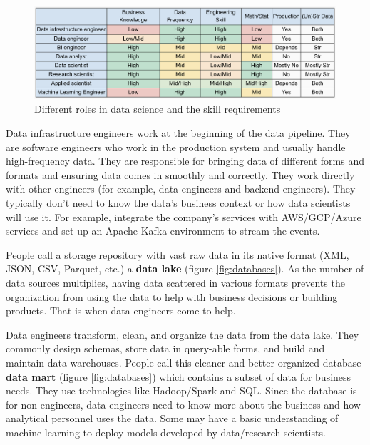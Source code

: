 \documentclass[
  12pt,
]{krantz}
\begin{document}
\begin{figure}
\centering
\includegraphics{images/dsrole.png}
\caption{Different roles in data science and the skill requirements}
\end{figure}

Data infrastructure engineers work at the beginning of the data pipeline. They are software engineers who work in the production system and usually handle high-frequency data. They are responsible for bringing data of different forms and formats and ensuring data comes in smoothly and correctly. They work directly with other engineers (for example, data engineers and backend engineers). They typically don't need to know the data's business context or how data scientists will use it. For example, integrate the company's services with AWS/GCP/Azure services and set up an Apache Kafka environment to stream the events.

People call a storage repository with vast raw data in its native format (XML, JSON, CSV, Parquet, etc.) a \textbf{data lake} (figure \ref{fig:databases}). As the number of data sources multiplies, having data scattered in various formats prevents the organization from using the data to help with business decisions or building products. That is when data engineers come to help.

Data engineers transform, clean, and organize the data from the data lake. They commonly design schemas, store data in query-able forms, and build and maintain data warehouses. People call this cleaner and better-organized database \textbf{data mart} (figure \ref{fig:databases}) which contains a subset of data for business needs. They use technologies like Hadoop/Spark and SQL. Since the database is for non-engineers, data engineers need to know more about the business and how analytical personnel uses the data. Some may have a basic understanding of machine learning to deploy models developed by data/research scientists.
\end{document}
